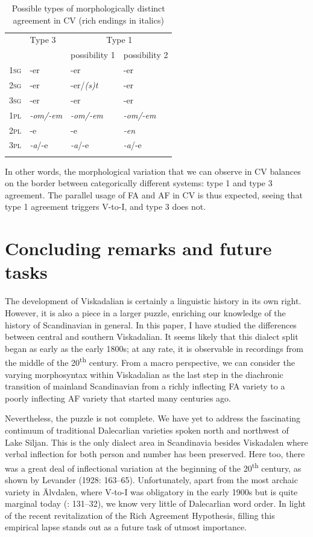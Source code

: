 \documentclass[output=paper,colorlinks,citecolor=brown,draft,draftmode]{langscibook}
\begin{document}
\begin{table}
\caption{Possible types of morphologically distinct agreement in CV (rich endings in italics)\label{tab:petzell:4}}
\begin{tabular}{>{\scshape}llll}
\lsptoprule
& Type 3 & \multicolumn{2}{c}{Type 1}\\\cmidrule(lr){3-4}
&  & possibility 1 & possibility 2\\
\midrule
1sg & -er & -er & -er\\
2sg & -er & -er/\textit{(s)t} & -er\\
3sg & -er & -er & -er\\
1pl & \textit{-om/-em} & \textit{-om/-em} & \textit{-om/-em}\\
2pl & -e & -e & \textit{-en}\\
3pl & \textit{-a}/-e & \textit{-a}/-e & \textit{-a}/-e\\
\lspbottomrule
\end{tabular}
\end{table}

In other words, the morphological variation that we can observe in CV balances on the border between categorically different systems: type 1 and type 3 agreement. The parallel usage of FA and AF in CV is thus expected, seeing that type 1 agreement triggers V-to-I, and type 3 does not.


\section{Concluding remarks and future tasks}\label{sec:petzell:6}


The development of Viskadalian is certainly a linguistic history in its own right. However, it is also a piece in a larger puzzle, enriching our knowledge of the history of Scandinavian in general. In this paper, I have studied the differences between central and southern Viskadalian. It seems likely that this dialect split began as early as the early 1800s; at any rate, it is observable in recordings from the middle of the 20\textsuperscript{th} century. From a macro perspective, we can consider the varying morphosyntax within Viskadalian as the last step in the diachronic transition of mainland Scandinavian from a richly inflecting FA variety to a poorly inflecting AF variety that started many centuries ago. 



Nevertheless, the puzzle is not complete. We have yet to address the fascinating continuum of traditional Dalecarlian varieties spoken north and northwest of Lake Siljan. This is the only dialect area in Scandinavia besides Viskadalen where verbal inflection for both person and number has been preserved. Here too, there was a great deal of inflectional variation at the beginning of the 20\textsuperscript{th} century, as shown by Levander (1928: 163–65). Unfortunately, apart from the most archaic variety in Älvdalen, where V-to-I was obligatory in the early 1900s \citep[124]{Levander1909} but is quite marginal today (\citealt{Garbacz2010}: 131–32), we know very little of Dalecarlian word order. In light of the recent revitalization of the Rich Agreement Hypothesis, filling this empirical lapse stands out as a future task of utmost importance.
\end{document}
